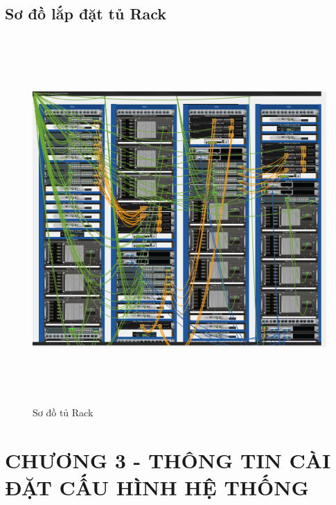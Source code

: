 \documentclass[12pt,a4paper]{report}
\begin{document}
\subsection{Sơ đồ lắp đặt tủ Rack}
\begin{figure}[H]
    \centering
    \includegraphics[width=16cm, height=14cm]{img/rack.png}
    \caption{Sơ đồ tủ Rack}
    \label{hinh23}
\end{figure}
\newpage


\section*{CHƯƠNG 3 - THÔNG TIN CÀI ĐẶT CẤU HÌNH HỆ THỐNG}
\setcounter{section}{3}
\setcounter{subsection}{0}
\setcounter{figure}{0}
\setcounter{table}{0}
\end{document}
